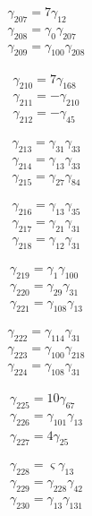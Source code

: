 \[\begin{aligned}\gamma_{207}=7 \gamma_{12}\\ \gamma_{208}=\gamma_{0} \gamma_{207}\\ \gamma_{209}=\gamma_{100} \gamma_{208}\end{aligned}\]

\[\begin{aligned}\gamma_{210}=7 \gamma_{168}\\ \gamma_{211}=- \gamma_{210}\\ \gamma_{212}=- \gamma_{45}\end{aligned}\]

\[\begin{aligned}\gamma_{213}=\gamma_{31} \gamma_{33}\\ \gamma_{214}=\gamma_{13} \gamma_{33}\\ \gamma_{215}=\gamma_{27} \gamma_{84}\end{aligned}\]

\[\begin{aligned}\gamma_{216}=\gamma_{13} \gamma_{35}\\ \gamma_{217}=\gamma_{21} \gamma_{31}\\ \gamma_{218}=\gamma_{12} \gamma_{31}\end{aligned}\]

\[\begin{aligned}\gamma_{219}=\gamma_{1} \gamma_{100}\\ \gamma_{220}=\gamma_{29} \gamma_{31}\\ \gamma_{221}=\gamma_{108} \gamma_{13}\end{aligned}\]

\[\begin{aligned}\gamma_{222}=\gamma_{114} \gamma_{31}\\ \gamma_{223}=\gamma_{100} \gamma_{218}\\ \gamma_{224}=\gamma_{108} \gamma_{31}\end{aligned}\]

\[\begin{aligned}\gamma_{225}=10 \gamma_{67}\\ \gamma_{226}=\gamma_{101} \gamma_{13}\\ \gamma_{227}=4 \gamma_{25}\end{aligned}\]

\[\begin{aligned}\gamma_{228}=\varsigma  \gamma_{13}\\ \gamma_{229}=\gamma_{228} \gamma_{42}\\ \gamma_{230}=\gamma_{13} \gamma_{131}\end{aligned}\]

